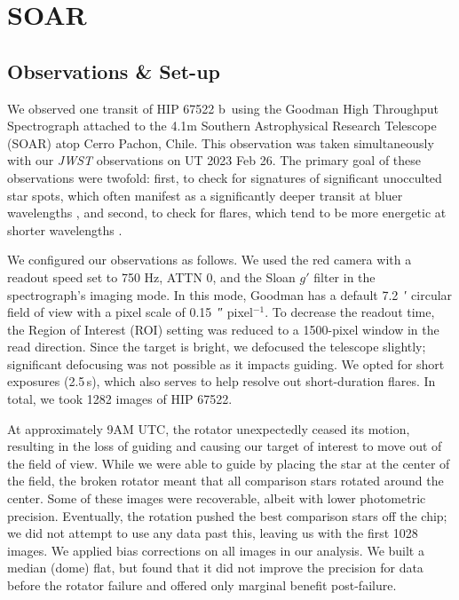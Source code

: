 \documentclass[twocolumn]{aastex63} %
\newcommand{\plname}{HIP 67522 b}
\newcommand{\starname}{HIP 67522}
\begin{document}
\section{SOAR} \label{sec:soar}

\subsection{Observations  \& Set-up}
We observed one transit of \plname\ using the Goodman High Throughput Spectrograph \citep{Clemens_2004} attached to the 4.1m Southern Astrophysical Research Telescope (SOAR) atop Cerro Pachon, Chile. This observation was taken simultaneously with our {\it JWST} observations on UT 2023 Feb 26. The primary goal of these observations were twofold: first, to check for signatures of significant unocculted star spots, which often manifest as a significantly deeper transit at bluer wavelengths \citep[e.g.,][]{Rackham2018,Thao2020}, and second, to check for flares, which tend to be more energetic at shorter wavelengths \citep{davenport2019evolution}. 

We configured our observations as follows. We used the red camera with a readout speed set to 750 Hz, ATTN 0, and the Sloan $g'$ filter in the spectrograph's imaging mode. In this mode, Goodman has a default \SI{7.2}{\arcminute} circular field of view with a pixel scale of \SI{0.15}{\arcsecond} pixel$^{-1}$. To decrease the readout time, the Region of Interest (ROI) setting was reduced to a 1500-pixel window in the read direction. Since the target is bright, we defocused the telescope slightly; significant defocusing was not possible as it impacts guiding. We opted for short exposures (2.5\,s), which also serves to help resolve out short-duration flares. In total, we took 1282 images of \starname. 

At approximately 9AM UTC, the rotator unexpectedly ceased its motion, resulting in the loss of guiding and causing our target of interest to move out of the field of view. While we were able to guide by placing the star at the center of the field, the broken rotator meant that all comparison stars rotated around the center. Some of these images were recoverable, albeit with lower photometric precision. Eventually, the rotation pushed the best comparison stars off the chip; we did not attempt to use any data past this, leaving us with the first 1028 images. We applied bias corrections on all images in our analysis. We built a median (dome) flat, but found that it did not improve the precision for data before the rotator failure and offered only marginal benefit post-failure.  
\end{document}
